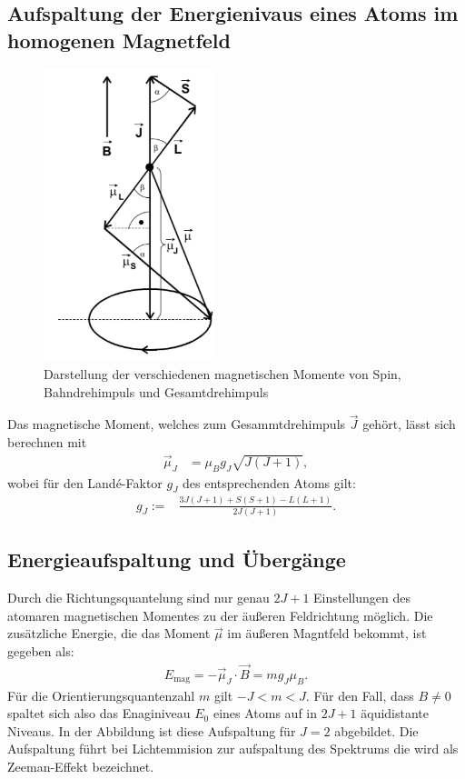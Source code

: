 \subsection{Aufspaltung der Energienivaus eines Atoms im homogenen Magnetfeld}
%
\begin{figure}[h!]
  \centering
  \includegraphics[width=5cm]{magmom1.png}
  \caption{Darstellung der verschiedenen magnetischen Momente von Spin, Bahndrehimpuls und Gesamtdrehimpuls}
  \label{fig:mag}
\end{figure}
%
Das magnetische Moment, welches zum Gesammtdrehimpuls $\vec{J}$ gehört, lässt sich berechnen mit
\begin{align*}
  \vec{\mu}_J&=\mu_Bg_J\sqrt{J(J+1)},
\end{align*}
wobei für den Landé-Faktor $g_J$ des entsprechenden Atoms gilt:
\begin{align}
		g_J:=&\frac{3J(J+1)+S(S+1)-L(L+1)}{2J(J+1)}.
\end{align}
\FloatBarrier

\subsection{Energieaufspaltung und Übergänge}
Durch die Richtungsquantelung sind nur genau $2J+1$ Einstellungen des atomaren magnetischen Momentes zu der äußeren Feldrichtung möglich.
Die zusätzliche Energie, die das Moment $\vec{\mu}$ im äußeren Magntfeld bekommt, ist gegeben als:
\begin{align*}
  E_{\text{mag}} = -\vec{\mu}_J \cdot \vec{B} = mg_J\mu_B.
\end{align*}
Für die Orientierungsquantenzahl $m$ gilt $-J < m < J$.
Für den Fall, dass $B \ne 0$ spaltet sich also das Enaginiveau $E_0$ eines Atoms auf in $2J+1$ äquidistante Niveaus.
In der Abbildung %
ist diese Aufspaltung für $J = 2$ abgebildet.
Die Aufspaltung führt bei Lichtemmision zur aufspaltung des Spektrums die wird als Zeeman-Effekt bezeichnet.

